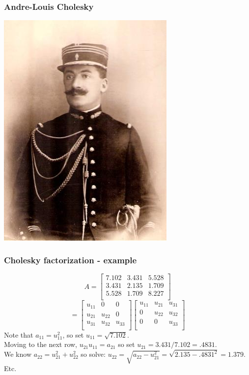 \documentclass[12pt]{beamer}
\theoremstyle{definition}
\begin{document}
\begin{frame}
\frametitle{Andre-Louis Cholesky}
\centerline{\includegraphics{cholesky.jpg}}
\end{frame}

\begin{frame}
\frametitle{Cholesky factorization - example}

\[
A = \left[ \begin{array}{ccc} 
7.102 & 3.431 & 5.528 \\
     3.431 & 2.135 & 1.709 \\
    5.528 &  1.709 & 8.227 \\
\end{array} \right] \] \[ =
\left[ \begin{array}{ccc} 
u_{11} & 0 & 0 \\
u_{21} & u_{22} & 0 \\
u_{31}  & u_{32} & u_{33}\\
\end{array} \right]
\left[ \begin{array}{ccc} 
u_{11} & u_{21} &  u_{31} \\
0 & u_{22} &  u_{32} \\
0 & 0  & u_{33}\\
\end{array} \right] \]
Note that $a_{11} = u_{11}^2$, so set $u_{11} = \sqrt{7.102}$. \\
Moving to the next row, $u_{21}u_{11} = a_{21}$ so set $u_{21} = 3.431/7.102 = .4831$.\\
We know $a_{22} = u_{21}^2 + u_{22}^2$ so solve: $u_{22} = \sqrt{a_{22} - u_{21}^2} = \sqrt{2.135 - .4831^2} = 1.379$. Etc.
\end{frame} 
\end{document}
